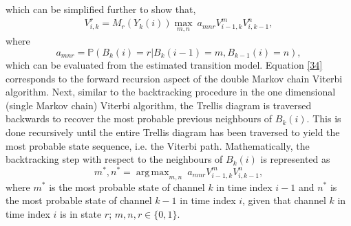 \documentclass[10pt,twocolumn]{IEEEtran}
\newcommand{\bk}[1]{{\color{red}{[BK: #1]}}}
\DeclareMathOperator*{\argmax}{arg\,max}
\begin{document}
which can be simplified further to show that,
\begin{equation}\label{34}
    \begin{aligned}
        V_{i,k}^{r} = M_r(Y_k(i))\max_{m,n}\ a_{mnr}V_{i-1,k}^{m}V_{i,k-1}^{n},
    \end{aligned}
\end{equation}
where
\begin{equation}\label{35}
    a_{mnr} = \mathbb{P}(B_k(i)=r|B_{k}(i-1)=m,B_{k-1}(i)=n),
\end{equation}
which can be evaluated from the estimated transition model. Equation \eqref{34} corresponds to the forward recursion aspect of the double Markov chain Viterbi algorithm. Next, similar to the backtracking procedure in the one dimensional (single Markov chain) Viterbi algorithm, the Trellis diagram is traversed backwards to recover the most probable previous neighbours of $B_k(i)$. This is done recursively until the entire Trellis diagram has been traversed to yield the most probable state sequence, i.e. the Viterbi path. Mathematically, the backtracking step with respect to the neighbours of $B_k(i)$ is represented as
\begin{equation}\label{36}
    m^*, n^* = \argmax_{m,n}\ a_{mnr}V_{i-1,k}^{m}V_{i,k-1}^{n},
\end{equation}
where $m^*$ is the most probable state of channel $k$ in time index $i-1$ and $n^*$ is the most probable state of channel $k-1$ in time index $i$, given that channel $k$ in time index $i$ is in state $r$; $m, n, r \in \{0,1\}$. \bk{Add the algorithm block!}
\end{document}
